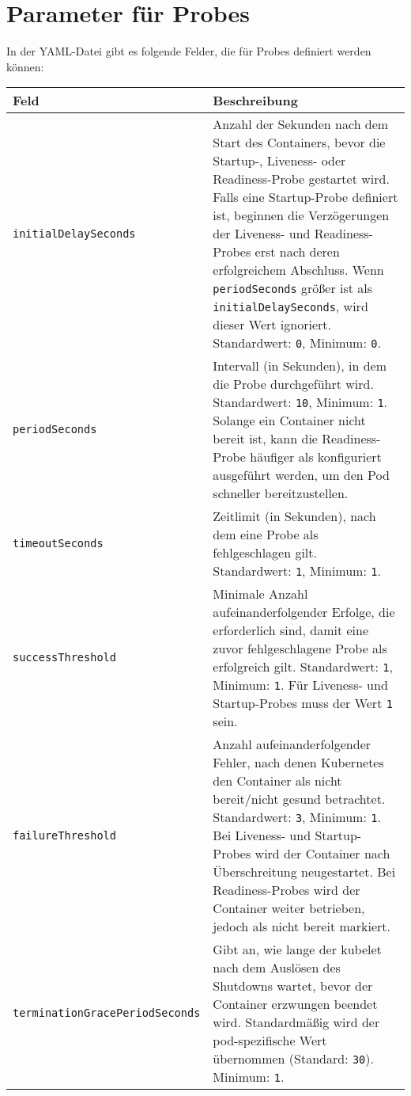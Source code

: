 \section{Parameter für Probes}
\noindent
In der YAML-Datei gibt es folgende Felder, die für Probes definiert werden können:\\
\begin{tabular}{|p{}|p{}|}
\hline
\textbf{Feld} & \textbf{Beschreibung} \\
\hline
\texttt{initialDelaySeconds} & Anzahl der Sekunden nach dem Start des Containers, bevor die Startup-, Liveness- oder Readiness-Probe gestartet wird. Falls eine Startup-Probe definiert ist, beginnen die Verzögerungen der Liveness- und Readiness-Probes erst nach deren erfolgreichem Abschluss. Wenn \texttt{periodSeconds} größer ist als \texttt{initialDelaySeconds}, wird dieser Wert ignoriert. Standardwert: \texttt{0}, Minimum: \texttt{0}. \\
\hline
\texttt{periodSeconds} & Intervall (in Sekunden), in dem die Probe durchgeführt wird. Standardwert: \texttt{10}, Minimum: \texttt{1}. Solange ein Container nicht bereit ist, kann die Readiness-Probe häufiger als konfiguriert ausgeführt werden, um den Pod schneller bereitzustellen. \\
\hline
\texttt{timeoutSeconds} & Zeitlimit (in Sekunden), nach dem eine Probe als fehlgeschlagen gilt. Standardwert: \texttt{1}, Minimum: \texttt{1}. \\
\hline
\texttt{successThreshold} & Minimale Anzahl aufeinanderfolgender Erfolge, die erforderlich sind, damit eine zuvor fehlgeschlagene Probe als erfolgreich gilt. Standardwert: \texttt{1}, Minimum: \texttt{1}. Für Liveness- und Startup-Probes muss der Wert \texttt{1} sein. \\
\hline
\texttt{failureThreshold} & Anzahl aufeinanderfolgender Fehler, nach denen Kubernetes den Container als nicht bereit/nicht gesund betrachtet. Standardwert: \texttt{3}, Minimum: \texttt{1}. Bei Liveness- und Startup-Probes wird der Container nach Überschreitung neugestartet. Bei Readiness-Probes wird der Container weiter betrieben, jedoch als nicht bereit markiert. \\
\hline
\texttt{terminationGracePeriodSeconds} & Gibt an, wie lange der kubelet nach dem Auslösen des Shutdowns wartet, bevor der Container erzwungen beendet wird. Standardmäßig wird der pod-spezifische Wert übernommen (Standard: \texttt{30}). Minimum: \texttt{1}. \\
\hline
\end{tabular}
\\
